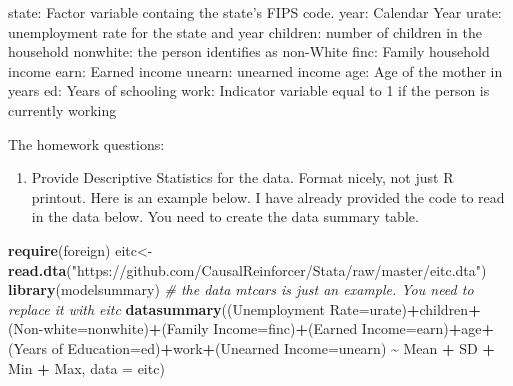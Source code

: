 \documentclass[
]{article}
\newenvironment{Shaded}{\begin{snugshade}}{\end{snugshade}}
\newcommand{\AttributeTok}[1]{\textcolor[rgb]{0.13,0.29,0.53}{#1}}
\newcommand{\CommentTok}[1]{\textcolor[rgb]{0.56,0.35,0.01}{\textit{#1}}}
\newcommand{\FunctionTok}[1]{\textcolor[rgb]{0.13,0.29,0.53}{\textbf{#1}}}
\newcommand{\NormalTok}[1]{#1}
\newcommand{\OtherTok}[1]{\textcolor[rgb]{0.56,0.35,0.01}{#1}}
\newcommand{\SpecialCharTok}[1]{\textcolor[rgb]{0.81,0.36,0.00}{\textbf{#1}}}
\newcommand{\StringTok}[1]{\textcolor[rgb]{0.31,0.60,0.02}{#1}}
\providecommand{\tightlist}{%
  \setlength{\itemsep}{0pt}\setlength{\parskip}{0pt}}
\begin{document}
state: Factor variable containg the state's FIPS code. year: Calendar
Year urate: unemployment rate for the state and year children: number of
children in the household nonwhite: the person identifies as non-White
finc: Family household income earn: Earned income unearn: unearned
income age: Age of the mother in years ed: Years of schooling work:
Indicator variable equal to 1 if the person is currently working

The homework questions:

\begin{enumerate}
\def\labelenumi{\arabic{enumi}.}
\tightlist
\item
  Provide Descriptive Statistics for the data. Format nicely, not just R
  printout. Here is an example below. I have already provided the code
  to read in the data below. You need to create the data summary table.
\end{enumerate}

\begin{Shaded}
\begin{Highlighting}[]
\FunctionTok{require}\NormalTok{(foreign)}
\NormalTok{eitc}\OtherTok{\textless{}{-}}\FunctionTok{read.dta}\NormalTok{(}\StringTok{"https://github.com/CausalReinforcer/Stata/raw/master/eitc.dta"}\NormalTok{)}
\FunctionTok{library}\NormalTok{(modelsummary)}
\CommentTok{\# the data mtcars is just an example. You need to replace it with eitc}
\FunctionTok{datasummary}\NormalTok{((}\StringTok{\textasciigrave{}}\AttributeTok{Unemployment Rate}\StringTok{\textasciigrave{}}\OtherTok{=}\NormalTok{urate)}\SpecialCharTok{+}\NormalTok{children}\SpecialCharTok{+}\NormalTok{(}\StringTok{\textasciigrave{}}\AttributeTok{Non{-}white}\StringTok{\textasciigrave{}}\OtherTok{=}\NormalTok{nonwhite)}\SpecialCharTok{+}\NormalTok{(}\StringTok{\textasciigrave{}}\AttributeTok{Family Income}\StringTok{\textasciigrave{}}\OtherTok{=}\NormalTok{finc)}\SpecialCharTok{+}\NormalTok{(}\StringTok{\textasciigrave{}}\AttributeTok{Earned Income}\StringTok{\textasciigrave{}}\OtherTok{=}\NormalTok{earn)}\SpecialCharTok{+}\NormalTok{age}\SpecialCharTok{+}\NormalTok{(}\StringTok{\textasciigrave{}}\AttributeTok{Years of Education}\StringTok{\textasciigrave{}}\OtherTok{=}\NormalTok{ed)}\SpecialCharTok{+}\NormalTok{work}\SpecialCharTok{+}\NormalTok{(}\StringTok{\textasciigrave{}}\AttributeTok{Unearned Income}\StringTok{\textasciigrave{}}\OtherTok{=}\NormalTok{unearn) }\SpecialCharTok{\textasciitilde{}}\NormalTok{ Mean }\SpecialCharTok{+}\NormalTok{ SD }\SpecialCharTok{+}\NormalTok{ Min }\SpecialCharTok{+}\NormalTok{ Max,}
            \AttributeTok{data =}\NormalTok{ eitc)}
\end{Highlighting}
\end{Shaded}
\end{document}
